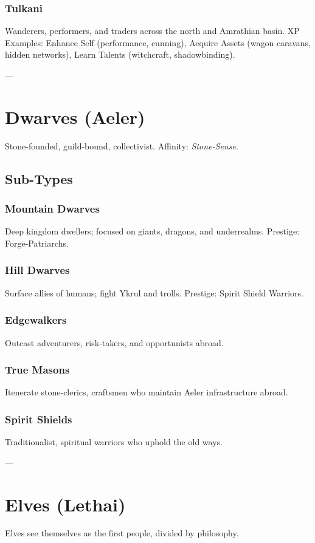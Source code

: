 \documentclass[11pt]{article}
\begin{document}
\subsubsection{Tulkani}
Wanderers, performers, and traders across the north and Amrathian basin.  
XP Examples: Enhance Self (performance, cunning), Acquire Assets (wagon caravans, hidden networks), Learn Talents (witchcraft, shadowbinding).  

---

\section{Dwarves (Aeler)}
Stone-founded, guild-bound, collectivist.  
Affinity: \emph{Stone-Sense}.  

\subsection{Sub-Types}
\subsubsection{Mountain Dwarves}
Deep kingdom dwellers; focused on giants, dragons, and underrealms. Prestige: Forge-Patriarchs.  

\subsubsection{Hill Dwarves}
Surface allies of humans; fight Ykrul and trolls. Prestige: Spirit Shield Warriors.  

\subsubsection{Edgewalkers}
Outcast adventurers, risk-takers, and opportunists abroad. 

\subsubsection{True Masons}
Itenerate stone-clerics, craftsmen who maintain Aeler infrastructure abroad.

\subsubsection{Spirit Shields}
Traditionalist, spiritual warriors who uphold the old ways.

---

\section{Elves (Lethai)}
Elves see themselves as the first people, divided by philosophy.  
\end{document}
